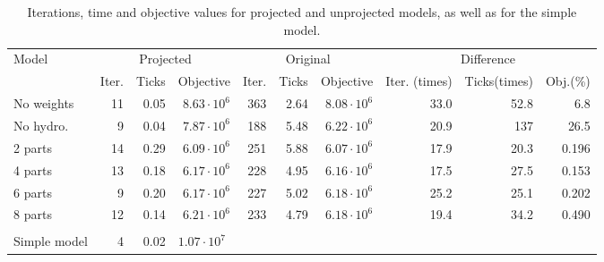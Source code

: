 \begin{table}[htbp]
\centering
\begin{tabular}{l|rrr|rrr|rrr}
\toprule
Model&\multicolumn{3}{c|}{Projected}&\multicolumn{3}{c|}{Original}&\multicolumn{3}{c}{Difference}\\
&Iter.&Ticks&Objective&Iter.&Ticks&Objective&Iter. (times)&Ticks(times)&Obj.(\%)\\ %
\midrule
No weights&	11 & 0.05 & $8.63\cdot 10^6$ &	363 & 2.64&$8.08\cdot 10^6$
&33.0&52.8&6.8\\
\midrule
{No hydro.}& 9 & 0.04 &$7.87\cdot 10^6$&	188 & 5.48&$6.22 \cdot 10^6$
&20.9&137&26.5\\
\midrule
{2 parts}& 14 & 0.29 & $6.09\cdot 10^6$ &	251 & 5.88&$6.07\cdot 10^6$
&17.9&20.3&0.196\\
\midrule
{4 parts} &13 & 0.18 &$6.17\cdot 10^6$ & 228 & 4.95 &$6.16\cdot 10^6$
&17.5&27.5&0.153\\
\midrule
{6 parts} &9 & 0.20& $6.17\cdot 10^6$ &227 & 5.02 &$6.18\cdot 10^6$
&25.2&25.1&0.202\\
\midrule
{8 parts} &12 & 0.14& $6.21\cdot 10^6$ & 233 & 4.79 &$6.18\cdot 10^6$
&19.4&34.2&0.490\\
\bottomrule
\multicolumn{10}{c}{}\\
\cmidrule{1-4}
Simple model & 4 & 0.02 &\multicolumn{2}{l}{$1.07\cdot 10^7$}\\
\cmidrule{1-4}
\end{tabular}
\caption{Iterations, time and objective values for projected and unprojected models, as well as for the simple model. }
\label{tab:usingProjections}
\end{table}

